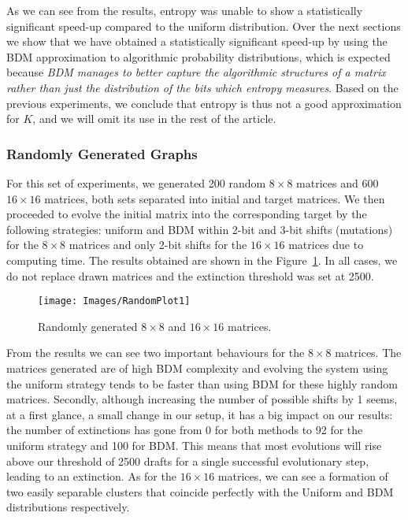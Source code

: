 \documentclass[10pt]{article}
\begin{document}
As we can see from the results, entropy was unable to show a statistically significant speed-up compared to the uniform distribution. Over the next sections we show that we have obtained a statistically significant speed-up by using the BDM approximation to algorithmic probability distributions, which is expected because \textit{BDM manages to better capture the algorithmic structures of a matrix rather than just the distribution of the bits which entropy measures}. Based on the previous experiments, we conclude that entropy is thus not a good approximation for \(K\), and we will omit its use in the rest of the article.


\subsubsection{Randomly Generated Graphs}\label{randomS}

For this set of experiments, we generated 200 random $8 \times 8$ matrices and 600 $16 \times 16$ matrices, both sets separated into initial and target matrices. We then proceeded to evolve the initial matrix into the corresponding target by the following strategies: uniform and BDM within 2-bit and 3-bit shifts (mutations) for the $8 \times 8$ matrices and only 2-bit shifts for the $16 \times 16$ matrices due to computing time. The results obtained are shown in the Figure~\ref{random1}. In all cases, we do not replace drawn matrices and the extinction threshold was set at 2500.

\begin{figure}[ht!]
    \centering
    \texttt{[image: Images/RandomPlot1]}
    \caption{Randomly generated $8 \times 8$ and $16 \times 16$ matrices. \label{random1}}
\end{figure}


From the results we can see two important behaviours for the $8 \times 8$ matrices. The  matrices generated are of high
 BDM complexity and evolving the system using the uniform strategy tends to be faster than using BDM for these highly random matrices. Secondly, although increasing the number of possible shifts by 1 seems, at a first glance, a small change in our setup, it
 has a big impact on our results: the number of extinctions has gone from 0 for both methods to 92 for the uniform strategy and 100 for BDM. This means that most evolutions will rise above our threshold of 2500 drafts for a single successful evolutionary step, leading to an extinction. As for the $16 \times 16$ matrices, we can see  a formation of two easily separable clusters that coincide perfectly with the Uniform and BDM distributions respectively.
\end{document}
